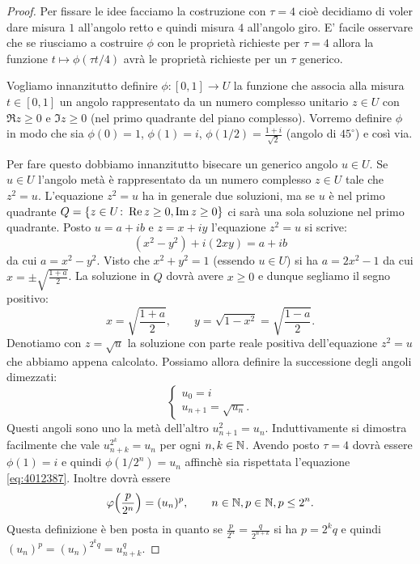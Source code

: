 \begin{proof}
Per fissare le idee facciamo la costruzione con $\tau=4$ 
cioè decidiamo di voler dare misura $1$ all'angolo retto e 
quindi misura $4$ all'angolo 
giro. 
E' facile osservare che se riusciamo a costruire $\phi$ con le proprietà 
richieste per $\tau=4$ allora la funzione $t\mapsto \phi(\tau t / 4)$ 
avrà le proprietà richieste per un $\tau$ generico.

Vogliamo innanzitutto definire $\phi\colon[0,1]\to U$ la funzione
che associa alla misura $t\in[0,1]$ un angolo rappresentato da 
un numero complesso unitario $z\in U$ con $\Re z\ge 0$ e $\Im z\ge 0$
(nel primo quadrante del piano complesso).
Vorremo definire $\phi$ in modo che sia $\phi(0)=1$, $\phi(1)=i$,
$\phi(1/2)=\frac{1+i}{\sqrt 2}$ (angolo di $45^\circ$) e così via.

Per fare questo dobbiamo innanzitutto bisecare un generico angolo 
$u\in U$.
Se $u\in U$ l'angolo metà è rappresentato da un numero 
complesso $z\in U$ tale che $z^2=u$. 
L'equazione $z^2=u$ ha in generale due soluzioni, ma se $u$ 
è nel primo quadrante $Q={\left\{ z\in U\colon \operatorname{Re} z\ge 0, \operatorname{Im} z\ge 0 \right\}}$
ci sarà una sola soluzione nel primo quadrante.
Posto $u=a+ib$ e $z=x+iy$ l'equazione $z^2=u$ si scrive:
\[
  (x^2-y^2) + i(2xy) = a+ib
\]
da cui $a=x^2-y^2$. Visto che $x^2+y^2=1$ (essendo $u\in U$)
si ha $a=2x^2-1$ da cui $x=\pm\sqrt{\frac{1+a}{2}}$.
La soluzione in $Q$ dovrà avere $x\ge 0$ e dunque segliamo 
il segno positivo:
\[
  x = \sqrt{\frac{1+a}{2}}, \qquad 
  y = \sqrt{1-x^2} = \sqrt{\frac{1-a}{2}}.
\]
Denotiamo con $z=\sqrt u$ la soluzione con parte reale positiva 
dell'equazione $z^2=u$ che abbiamo appena calcolato.
Possiamo allora definire la successione degli angoli dimezzati:
\[
\begin{cases}
u_0 = i\\
u_{n+1} = \sqrt{u_n}.
\end{cases}
\]
Questi angoli sono uno la metà dell'altro $u_{n+1}^2 = u_n$.
Induttivamente si dimostra facilmente che vale $u_{n+k}^{2^k} = u_n$
per ogni $n,k\in {\mathbb N}$.
Avendo posto $\tau=4$ dovrà essere $\phi(1)=i$ e quindi 
$\phi(1/2^n)=u_n$ affinchè sia rispettata l'equazione \eqref{eq:4012387}.
Inoltre dovrà essere
\begin{equation}
\varphi{\left( \frac{p}{2^n} \right)} = (u_n)^p,
\qquad n\in {\mathbb N}, p\in {\mathbb N}, p\le 2^n.
\end{equation}
Questa definizione è ben posta in quanto se $\frac{p}{2^n}=\frac{q}{2^{n+k}}$
si ha $p=2^k q$ e quindi $(u_n)^p = (u_n)^{2^k q} = u_{n+k}^q$.


\end{proof}
